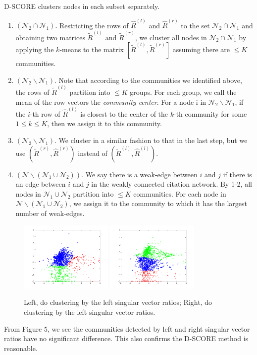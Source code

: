 \documentclass{article}
\numberwithin{equation}{section}
\begin{document}
	D-SCORE clusters nodes in each subset separately.
	\begin{enumerate}
		\item $(\mathcal{N}_2 \cap \mathcal{N}_1).$ Restricting the rows of $\hat{R}^{(l)}$ and $\hat{R}^{(r)}$ to the set $\mathcal{N}_2 \cap \mathcal{N}_1$ and obtaining two matrices $\tilde{R}^{(l)}$ and $\tilde{R}^{(r)}$, we cluster all nodes in $\mathcal{N}_2 \cap \mathcal{N}_1$ by applying the $k$-means to the matrix $[\tilde{R}^{(l)},\tilde{R}^{(r)}]$ assuming there are $\leq K$ communities.
		\item $(\mathcal{N}_2 \backslash \mathcal{N}_1)$.  Note that according to the communities we identified above,
		the rows of $\tilde{R}^{(l)}$ partition into $\leq K$ groups. For each group, we call the mean of the row vectors the \emph{community center}. For a node i in $\mathcal{N}_2 \backslash \mathcal{N}_1$, if the $i$-th row of  $\hat{R}^{(l)}$ is closest to the center of the $k$-th community for some $1 \leq k \leq K$, then we assign it to this community.
		\item  $(\mathcal{N}_2 \backslash \mathcal{N}_1)$. We cluster in a similar fashion to that in the last step, but we use $(\tilde{R}^{(r)},\hat{R}^{(r)})$ instead of $(\tilde{R}^{(l)},\hat{R}^{(l)})$.
		\item  $(\mathcal{N} \backslash (\mathcal{N}_1\cup \mathcal{N}_2))$.  We say there is a weak-edge between $i$ and $j$ if there
		is an edge between $i$ and $j$ in the weakly connected citation network. By 1-2, all nodes in $\mathcal{N}_1\cup \mathcal{N}_2$ partition into $\leq K$ communities. For each node in $\mathcal{N} \backslash (\mathcal{N}_1\cup \mathcal{N}_2)$, we assign it to the community to which it has the largest number of weak-edges.
	\end{enumerate}
\begin{figure}[H] \label{fig:kmeans}
	\centering
	\includegraphics[width=0.4\textwidth]{Dscore/cite-dscore-3-l.png}
	\includegraphics[width=0.4\textwidth]{Dscore/cite-dscore-3-r.png}
	\caption{Left, do clustering by the left singular vector ratios; Right, do clustering by the left singular vector ratios.}
\end{figure}
From Figure 5, we see the communities detected by left and right singular vector ratios have no significant difference. This also confirms the D-SCORE method is reasonable.
 
\end{document}
